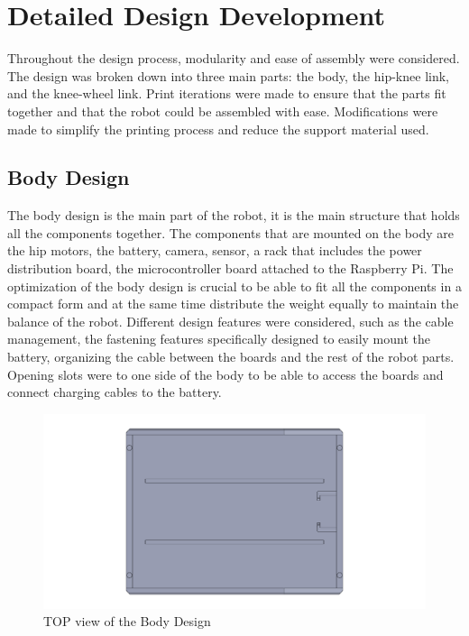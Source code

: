 \section{Detailed Design Development}
Throughout the design process, modularity and ease of assembly were considered.
The design was broken down into three main parts: the body, the hip-knee link, and the knee-wheel link.
Print iterations were made to ensure that the parts fit together and that the robot could be assembled with ease. Modifications were made to simplify the printing process and reduce the support material used.


\subsection{Body Design}
The body design is the main part of the robot, it is the main structure that holds all the components together.
The components that are mounted on the body are the hip motors, the battery, camera, sensor, a rack that includes the power distribution board, the microcontroller board attached to the Raspberry Pi. The optimization of the body design is crucial to be able to fit all the components in a compact form and at the same time distribute the weight equally to maintain the balance of the robot.
Different design features were considered, such as the cable management, the fastening features specifically designed to easily mount the battery, organizing the cable between the boards and the rest of the robot parts.
Opening slots were to one side of the body to be able to access the boards and connect charging cables to the battery.
\begin{figure}[h]
	\centering
	\includegraphics[width=1\linewidth]{Body_Design_1}
	\caption[TOP view of the Body Design]{TOP view of the Body Design}
	\label{fig:bodydesign1}
\end{figure}
